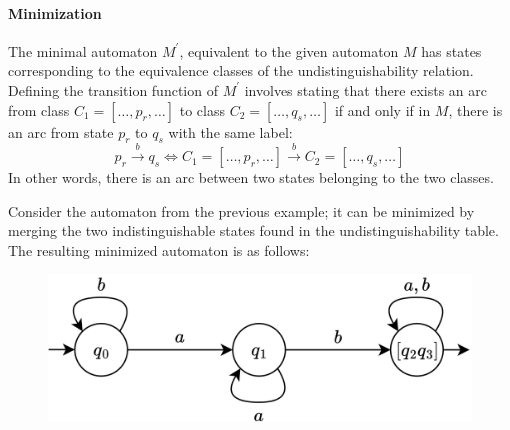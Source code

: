 \paragraph*{Minimization}
The minimal automaton $M^{'}$, equivalent to the given automaton $M$ has states corresponding to the equivalence classes of the undistinguishability relation.
Defining the transition function of  $M^{'}$ involves stating that there exists an arc from class $C_1=[\dots,p_r,\dots]$ to class $C_2=[\dots,q_s,\dots]$ if and only if in $M$, there is an arc from state $p_r$ to $q_s$ with the same label:
\[p_r \overset{b}{\rightarrow}q_s \Leftrightarrow C_1=[\dots,p_r,\dots] \overset{b}{\rightarrow} C_2=[\dots,q_s,\dots]\]
In other words, there is an arc between two states belonging to the two classes.
\begin{example}
    Consider the automaton from the previous example; it can be minimized by merging the two indistinguishable states found in the undistinguishability table.
    The resulting minimized automaton is as follows:
    \begin{figure}[H]
        \centering
        \includegraphics[width=0.6\linewidth]{images/fsamin1.png}
    \end{figure}
\end{example}
